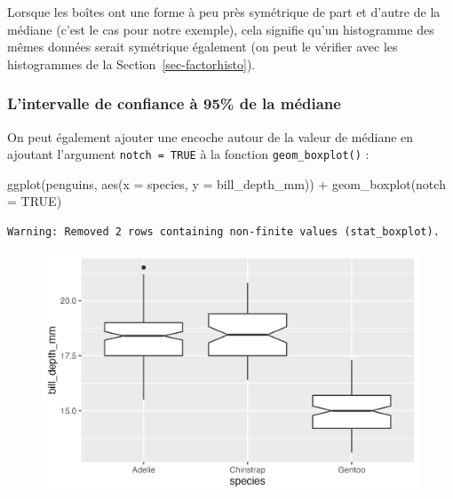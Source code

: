 \documentclass[
  letterpaper,
  DIV=11,
  numbers=noendperiod]{scrreprt}
\newenvironment{Shaded}{\begin{snugshade}}{\end{snugshade}}
\newcommand{\AttributeTok}[1]{\textcolor[rgb]{0.40,0.45,0.13}{#1}}
\newcommand{\ConstantTok}[1]{\textcolor[rgb]{0.56,0.35,0.01}{#1}}
\newcommand{\FunctionTok}[1]{\textcolor[rgb]{0.28,0.35,0.67}{#1}}
\newcommand{\NormalTok}[1]{\textcolor[rgb]{0.00,0.23,0.31}{#1}}
\newcommand{\SpecialCharTok}[1]{\textcolor[rgb]{0.37,0.37,0.37}{#1}}
\begin{document}
Lorsque les boîtes ont une forme à peu près symétrique de part et
d'autre de la médiane (c'est le cas pour notre exemple), cela signifie
qu'un histogramme des mêmes données serait symétrique également (on peut
le vérifier avec les histogrammes de la Section~\ref{sec-factorhisto}).

\hypertarget{lintervalle-de-confiance-uxe0-95-de-la-muxe9diane}{%
\subsubsection{L'intervalle de confiance à 95\% de la
médiane}\label{lintervalle-de-confiance-uxe0-95-de-la-muxe9diane}}

On peut également ajouter une encoche autour de la valeur de médiane en
ajoutant l'argument \texttt{notch\ =\ TRUE} à la fonction
\texttt{geom\_boxplot()} :

\begin{Shaded}
\begin{Highlighting}[]
\FunctionTok{ggplot}\NormalTok{(penguins, }\FunctionTok{aes}\NormalTok{(}\AttributeTok{x =}\NormalTok{ species, }\AttributeTok{y =}\NormalTok{ bill\_depth\_mm)) }\SpecialCharTok{+}
  \FunctionTok{geom\_boxplot}\NormalTok{(}\AttributeTok{notch =} \ConstantTok{TRUE}\NormalTok{)}
\end{Highlighting}
\end{Shaded}

\begin{verbatim}
Warning: Removed 2 rows containing non-finite values (stat_boxplot).
\end{verbatim}

\begin{figure}[H]

{\centering \includegraphics{./03-visualization_files/figure-pdf/unnamed-chunk-73-1.png}

}

\end{figure}
\end{document}

